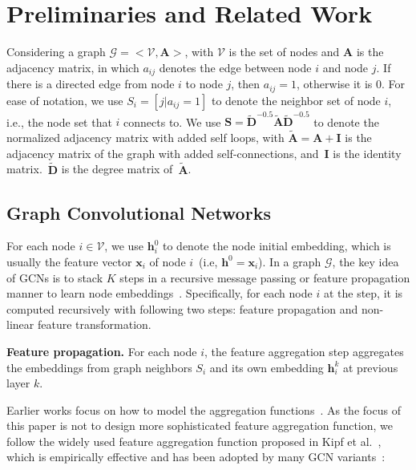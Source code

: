 \documentclass[letterpaper]{article} %
\newcommand{\Mat}[1]{\mathbf{#1}}
\begin{document}
 

\section{Preliminaries and Related Work}
Considering a graph $\mathcal{G}\!=\!<\!\mathcal{V}, \!\mathbf{A}>$, with $\mathcal{V}$ is the set of nodes and $\mathbf{A}$ is the adjacency matrix, in which $a_{ij}$ denotes the edge between node $i$ and node $j$. If there is a directed edge from node $i$ to node $j$, then $a_{ij}\!=\!1$, otherwise it is 0. For ease of notation, we use $S_i\!=\![j| a_{ij}\!=\!1]$ to denote the neighbor set of node $i$, i.e., the node set that $i$ connects to. We use $\Mat{S}\!=\!\Mat{\tilde{D}}^{-0.5}\Mat{\tilde{A}}\Mat{\tilde{D}}^{-0.5}$ to denote the normalized adjacency matrix with added self loops, with $\Mat{\tilde{A}}=\Mat{A}+\Mat{I}$ is the adjacency matrix of the graph with added self-connections, and~$\mathbf{I}$ is the identity matrix.~$\Mat{\tilde{D}}$ is the degree matrix of~$\Mat{\tilde{A}}$.


\subsection{Graph Convolutional Networks}
For each node $i\!\in\!\mathcal{V}$, we use $\mathbf{h}^0_i$ to denote the node initial embedding, which is usually the feature vector $\mathbf{x}_i$ of node $i$~(i.e, $\mathbf{h}^0=\mathbf{x}_i$).  In a graph $\mathcal{G}$, the key idea of GCNs is to stack $K$ steps in a recursive message passing or feature propagation manner to learn node embeddings~\cite{kdd2018GCMC,NIPS2017inductive,ICML2017neural}. Specifically, for each node $i$ at the step, it is computed recursively with following two steps: feature propagation and non-linear feature transformation.





\textbf{Feature propagation.}  
For each node $i$, the feature aggregation step aggregates the embeddings from graph neighbors $S_i$ and its own embedding $\mathbf{h}^k_i$ at previous layer $k$.
 
Earlier works focus on how to model the aggregation functions~\cite{NIPS2017inductive,ICML2017neural,ICLR2018graphATT,ICLR2017semi}. As the focus of this paper is not to design more sophisticated feature aggregation function, we follow the widely used feature aggregation function proposed in Kipf et al.~\cite{ICLR2017semi}, which is empirically effective and has been adopted by many GCN variants~\cite{ICLR2017semi,kdd2018GCMC,ICML2019simplifying}:
\end{document}
